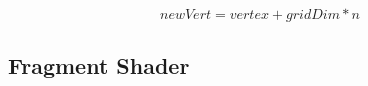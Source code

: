 \begin{displaymath}
  newVert = vertex + gridDim * n
\end{displaymath}







\subsection{Fragment Shader}\label{sec:grassFrag}








